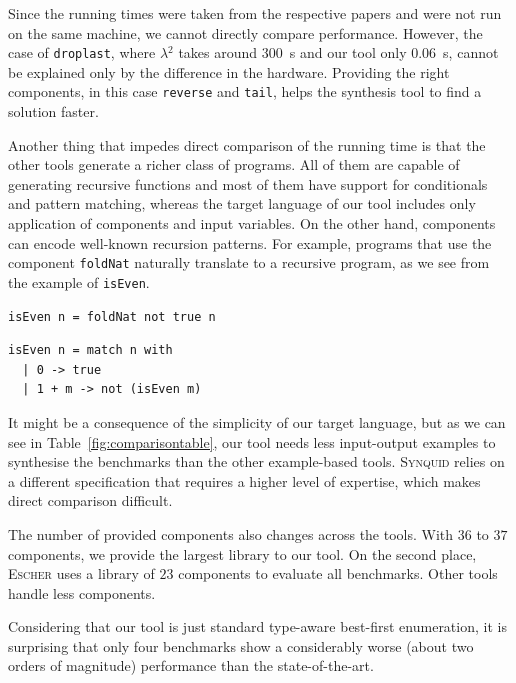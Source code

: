 Since the running times were taken from the respective papers and were not run on the same machine, we cannot directly compare performance. However, the case of \lstinline?droplast?, where \textsc{$\lambda^2$} takes around \SI{300}{s} and our tool only \SI{0.06}{s}, cannot be explained only by the difference in the hardware. Providing the right components, in this case \lstinline?reverse? and \lstinline?tail?, helps the synthesis tool to find a solution faster.

Another thing that impedes direct comparison of the running time is that the other tools generate a richer class of programs. All of them are capable of generating recursive functions and most of them have support for conditionals and pattern matching, whereas the target language of our tool includes only application of components and input variables. On the other hand, components can encode well-known recursion patterns. For example, programs that use the component \lstinline?foldNat? naturally translate to a recursive program, as we see from the example of \lstinline?isEven?.
\begin{lstlisting}[style=plain]
isEven n = foldNat not true n
\end{lstlisting}
\begin{lstlisting}[style=plain]
isEven n = match n with
  | 0 -> true
  | 1 + m -> not (isEven m)
\end{lstlisting}

It might be a consequence of the simplicity of our target language, but as we can see in Table~\ref{fig:comparisontable}, our tool needs less input-output examples to synthesise the benchmarks than the other example-based tools. \textsc{Synquid} relies on a different specification that requires a higher level of expertise, which makes direct comparison difficult.

The number of provided components also changes across the tools. With $36$ to $37$ components, we provide the largest library to our tool. On the second place, \textsc{Escher} uses a library of $23$ components to evaluate all benchmarks. Other tools handle less components.

Considering that our tool is just standard type-aware best-first enumeration, it is surprising that only four benchmarks show a considerably worse (about two orders of magnitude) performance than the state-of-the-art.



